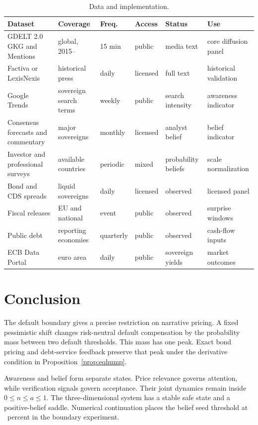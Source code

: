 \documentclass[11pt]{article}
\theoremstyle{definition}
\begin{document}
\begin{table}[t]
\centering
\caption{Data and implementation.}
\label{tab:feas7}
\scriptsize
\setlength{\tabcolsep}{2.5pt}
\begin{tabular}{p{3.4cm}p{2.9cm}p{1.4cm}p{1.8cm}p{2.4cm}p{1.6cm}}
\toprule
Dataset & Coverage & Freq. & Access & Status & Use \\
\midrule
GDELT 2.0 GKG and Mentions \citep{GDELTData} & global, 2015-- & 15 min & public & media text & core diffusion panel \\
Factiva or LexisNexis & historical press & daily & licensed & full text & historical validation \\
Google Trends \citep{GoogleTrendsData} & sovereign search terms & weekly & public & search intensity & awareness indicator \\
Consensus forecasts and commentary & major sovereigns & monthly & licensed & analyst belief & belief indicator \\
Investor and professional surveys & available countries & periodic & mixed & probability beliefs & scale normalization \\
Bond and CDS spreads & liquid sovereigns & daily & licensed & observed & licensed panel \\
Fiscal releases \citep{EurostatCalendar} & EU and national & event & public & observed & surprise windows \\
Public debt \citep{WorldBankQPSD7} & reporting economies & quarterly & public & observed & cash-flow inputs \\
ECB Data Portal \citep{ECBDataPortal7} & euro area & daily & public & sovereign yields & market outcomes \\
\bottomrule
\end{tabular}
\end{table}

\section{Conclusion}\label{sec:conclusion}

The default boundary gives a precise restriction on narrative pricing. A fixed pessimistic shift changes risk-neutral default compensation by the probability mass between two default thresholds. This mass has one peak. Exact bond pricing and debt-service feedback preserve that peak under the derivative condition in Proposition~\ref{prop:eqhump}.

Awareness and belief form separate states. Price relevance governs attention, while verification signals govern acceptance. Their joint dynamics remain inside $0\leq n\leq a\leq1$. The three-dimensional system has a stable safe state and a positive-belief saddle. Numerical continuation places the belief seed threshold at \SeedThresholdPct\ percent in the boundary experiment.
\end{document}
